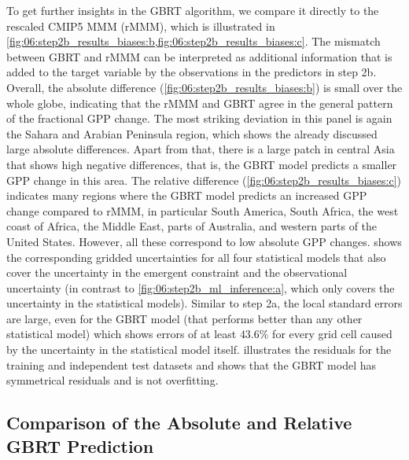 To get further insights in the \ac{GBRT} algorithm, we compare it directly to
the rescaled \acs{CMIP}5 \ac{MMM} (r\acs{MMM}), which is illustrated in
\cref{fig:06:step2b_results_biases:b,fig:06:step2b_results_biases:c}. The
mismatch between \ac{GBRT} and r\acs{MMM} can be interpreted as additional
information that is added to the target variable by the observations in the
predictors in step 2b. Overall, the absolute difference
(\cref{fig:06:step2b_results_biases:b}) is small over the whole globe,
indicating that the r\acs{MMM} and \ac{GBRT} agree in the general pattern of
the fractional \ac{GPP} change. The most striking deviation in this panel is
again the Sahara and Arabian Peninsula region, which shows the already
discussed large absolute differences. Apart from that, there is a large patch
in central Asia that shows high negative differences, that is, the \ac{GBRT}
model predicts a smaller \ac{GPP} change in this area. The relative difference
(\cref{fig:06:step2b_results_biases:c}) indicates many regions where the
\ac{GBRT} model predicts an increased \ac{GPP} change compared to r\acs{MMM},
in particular South America, South Africa, the west coast of Africa, the Middle
East, parts of Australia, and western parts of the United States. However, all
these correspond to low absolute \ac{GPP} changes.
 shows the corresponding gridded
uncertainties for all four statistical models that also cover the uncertainty
in the emergent constraint and the observational uncertainty (in contrast to
\cref{fig:06:step2b_ml_inference:a}, which only covers the uncertainty in the
statistical models). Similar to step 2a, the local standard errors are large,
even for the \ac{GBRT} model (that performs better than any other statistical
model) which shows errors of at least $43.6 \unit{\%}$ for every grid cell
caused by the uncertainty in the statistical model itself.
 illustrates the residuals for the training and
independent test datasets and shows that the \ac{GBRT} model has symmetrical
residuals and is not overfitting.


\subsection{Comparison of the Absolute and Relative \acs{GBRT} Prediction}
\label{subsec:06:comparison_step2a_step2b}

